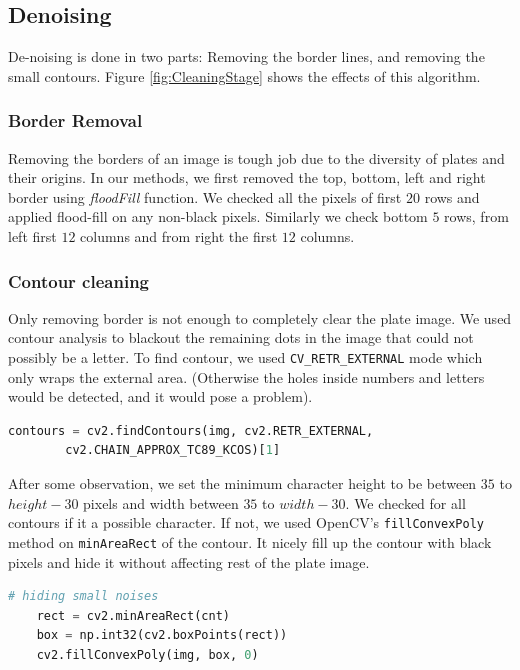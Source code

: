 \documentclass{standalone}
\begin{document}
\subsection{Denoising}
De-noising is done in two parts: Removing the border lines, and removing the small contours. Figure \ref{fig:CleaningStage} shows the effects of this algorithm.

\subsubsection{Border Removal}
Removing the borders of an image is tough job due to the diversity of plates and their origins. In our methods, we first removed the top, bottom, left and right border using {\it floodFill} function. We checked all the pixels of first $20$ rows and applied flood-fill on any non-black pixels. Similarly we check bottom $5$ rows, from left first $12$ columns and from right the first $12$ columns.

\subsubsection{Contour cleaning}
Only removing border is not enough to completely clear the plate image. We used contour analysis to blackout the remaining dots in the image that could not possibly be a letter.
To find contour, we used \texttt{CV\_RETR\_EXTERNAL} mode which only wraps the external area. (Otherwise the holes inside numbers and letters would be detected, and it would pose a problem).
\begin{lstlisting}[language=Python]
    contours = cv2.findContours(img, cv2.RETR_EXTERNAL,
        cv2.CHAIN_APPROX_TC89_KCOS)[1]
\end{lstlisting}

After some observation, we set the minimum character height to be between $35$ to $height-30$ pixels and width between $35$ to $width-30$. We checked for all contours if it a possible character. If not, we used OpenCV's \texttt{fillConvexPoly} method on \texttt{minAreaRect} of the contour. It nicely fill up the contour with black pixels and hide it without affecting rest of the plate image.

\begin{lstlisting}[language=Python]
    # hiding small noises
    rect = cv2.minAreaRect(cnt)
    box = np.int32(cv2.boxPoints(rect))
    cv2.fillConvexPoly(img, box, 0)
\end{lstlisting}
\end{document}
